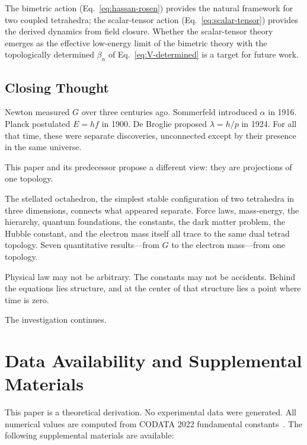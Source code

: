 \documentclass[aps,prd,preprint,superscriptaddress,showpacs,preprintnumbers,amsmath,amssymb,nofootinbib]{revtex4-2}
\begin{document}
The bimetric action (Eq.~\ref{eq:hassan-rosen}) provides the natural framework for two coupled tetrahedra; the scalar-tensor action (Eq.~\ref{eq:scalar-tensor}) provides the derived dynamics from field closure. Whether the scalar-tensor theory emerges as the effective low-energy limit of the bimetric theory with the topologically determined $\beta_n$ of Eq.~\ref{eq:V-determined} is a target for future work.

\subsection{Closing Thought}
\label{subsec:closing}

Newton measured $G$ over three centuries ago. Sommerfeld introduced $\alpha$ in 1916. Planck postulated $E = hf$ in 1900. De Broglie proposed $\lambda = h/p$ in 1924. For all that time, these were separate discoveries, unconnected except by their presence in the same universe.

This paper and its predecessor propose a different view: they are projections of one topology.

The stellated octahedron, the simplest stable configuration of two tetrahedra in three dimensions, connects what appeared separate. Force laws, mass-energy, the hierarchy, quantum foundations, the constants, the dark matter problem, the Hubble constant, and the electron mass itself all trace to the same dual tetrad topology. Seven quantitative results---from $G$ to the electron mass---from one topology.

Physical law may not be arbitrary. The constants may not be accidents. Behind the equations lies structure, and at the center of that structure lies a point where time is zero.

The investigation continues.

\section*{Data Availability and Supplemental Materials}

This paper is a theoretical derivation. No experimental data were generated. All numerical values are computed from CODATA 2022 fundamental constants~\cite{codata2022}. The following supplemental materials are available:
\end{document}
